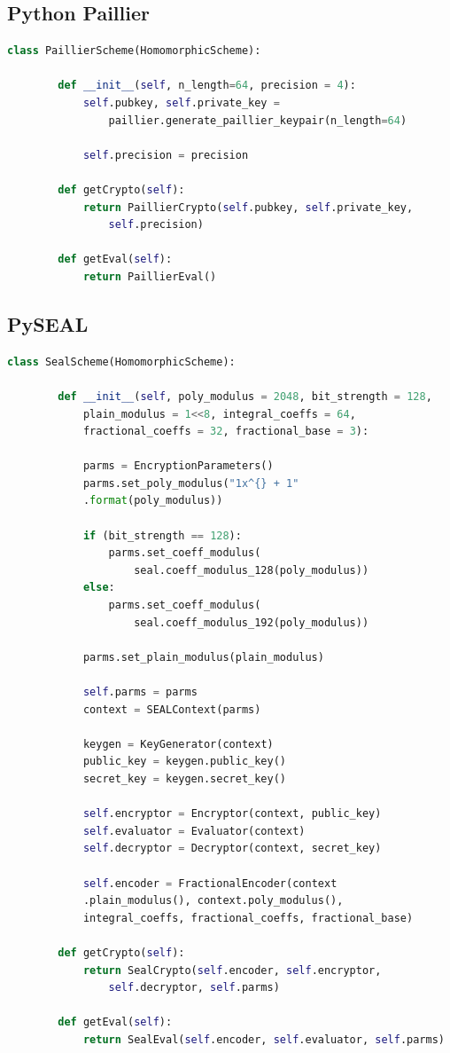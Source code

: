 \documentclass[10pt, a4paper]{article}
\begin{document}
		\subsection{Python Paillier}
	
	\begin{lstlisting}[language=Python,caption = Paillier Scheme Initialization]
		class PaillierScheme(HomomorphicScheme):
		
		def __init__(self, n_length=64, precision = 4):
			self.pubkey, self.private_key = 
				paillier.generate_paillier_keypair(n_length=64)
				
			self.precision = precision
		
		def getCrypto(self):
			return PaillierCrypto(self.pubkey, self.private_key, 
				self.precision)
		
		def getEval(self):
			return PaillierEval()
	\end{lstlisting}
	\subsection{PySEAL}
	\begin{lstlisting}[language=Python,caption = SEAL Scheme Initialization]
	class SealScheme(HomomorphicScheme):
	
		def __init__(self, poly_modulus = 2048, bit_strength = 128, 
			plain_modulus = 1<<8, integral_coeffs = 64, 
			fractional_coeffs = 32, fractional_base = 3):
			
			parms = EncryptionParameters()
			parms.set_poly_modulus("1x^{} + 1"
			.format(poly_modulus))
			
			if (bit_strength == 128):
				parms.set_coeff_modulus(
					seal.coeff_modulus_128(poly_modulus))
			else:
				parms.set_coeff_modulus(
					seal.coeff_modulus_192(poly_modulus))
			
			parms.set_plain_modulus(plain_modulus)
			
			self.parms = parms
			context = SEALContext(parms)
			
			keygen = KeyGenerator(context)
			public_key = keygen.public_key()
			secret_key = keygen.secret_key()
			
			self.encryptor = Encryptor(context, public_key)
			self.evaluator = Evaluator(context)
			self.decryptor = Decryptor(context, secret_key)
			
			self.encoder = FractionalEncoder(context
			.plain_modulus(), context.poly_modulus(), 
			integral_coeffs, fractional_coeffs, fractional_base)
		
		def getCrypto(self):
			return SealCrypto(self.encoder, self.encryptor, 
				self.decryptor, self.parms)
		
		def getEval(self):
			return SealEval(self.encoder, self.evaluator, self.parms)
	\end{lstlisting}
	
\end{document}
